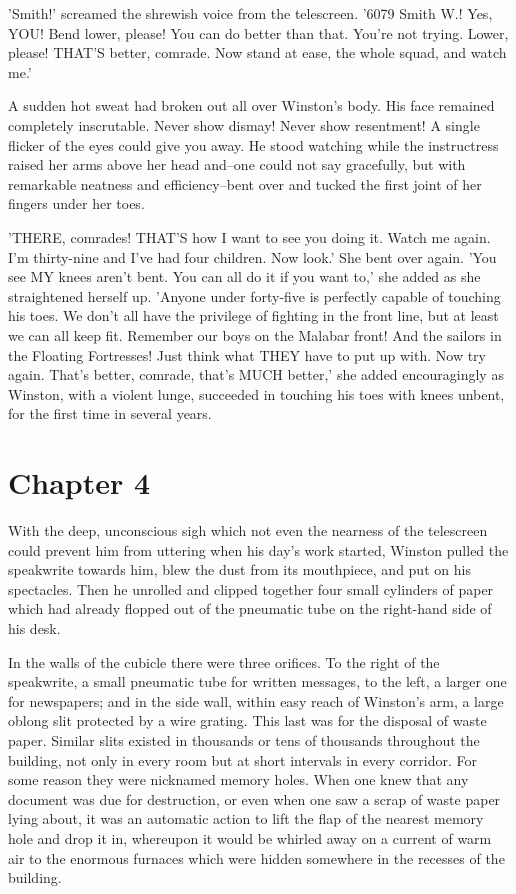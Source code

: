 \documentclass{article}
\begin{document}
'Smith!' screamed the shrewish voice from the telescreen. '6079 Smith W.!
Yes, YOU! Bend lower, please! You can do better than that. You're not
trying. Lower, please! THAT'S better, comrade. Now stand at ease, the
whole squad, and watch me.'

A sudden hot sweat had broken out all over Winston's body. His face
remained completely inscrutable. Never show dismay! Never show resentment!
A single flicker of the eyes could give you away. He stood watching while
the instructress raised her arms above her head and--one could not say
gracefully, but with remarkable neatness and efficiency--bent over and
tucked the first joint of her fingers under her toes.

'THERE, comrades! THAT'S how I want to see you doing it. Watch me again.
I'm thirty-nine and I've had four children. Now look.' She bent over again.
'You see MY knees aren't bent. You can all do it if you want to,' she added
as she straightened herself up. 'Anyone under forty-five is perfectly
capable of touching his toes. We don't all have the privilege of fighting
in the front line, but at least we can all keep fit. Remember our boys on
the Malabar front! And the sailors in the Floating Fortresses! Just think
what THEY have to put up with. Now try again. That's better, comrade,
that's MUCH better,' she added encouragingly as Winston, with a violent
lunge, succeeded in touching his toes with knees unbent, for the first
time in several years.




\section{Chapter 4}



With the deep, unconscious sigh which not even the nearness of the
telescreen could prevent him from uttering when his day's work started,
Winston pulled the speakwrite towards him, blew the dust from its
mouthpiece, and put on his spectacles. Then he unrolled and clipped
together four small cylinders of paper which had already flopped out of
the pneumatic tube on the right-hand side of his desk.

In the walls of the cubicle there were three orifices. To the right of the
speakwrite, a small pneumatic tube for written messages, to the left, a
larger one for newspapers; and in the side wall, within easy reach of
Winston's arm, a large oblong slit protected by a wire grating. This last
was for the disposal of waste paper. Similar slits existed in thousands or
tens of thousands throughout the building, not only in every room but at
short intervals in every corridor. For some reason they were nicknamed
memory holes. When one knew that any document was due for destruction, or
even when one saw a scrap of waste paper lying about, it was an automatic
action to lift the flap of the nearest memory hole and drop it in,
whereupon it would be whirled away on a current of warm air to the enormous
furnaces which were hidden somewhere in the recesses of the building.
\end{document}
